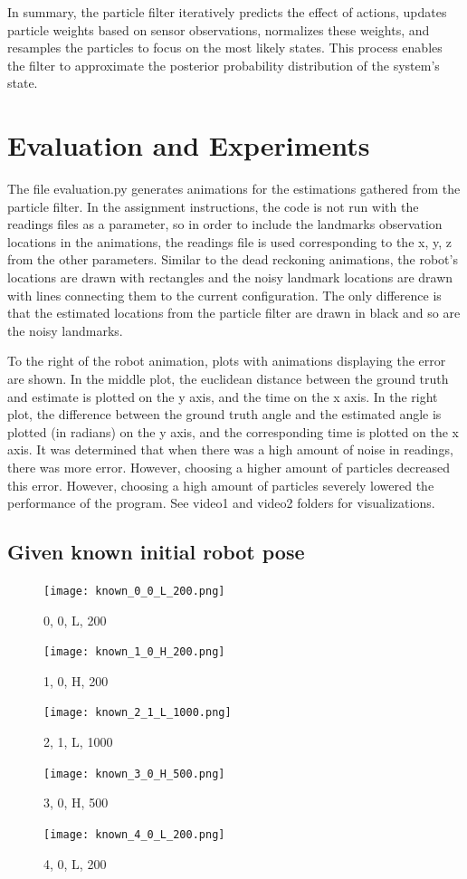 \documentclass{article}
\begin{document}
In summary, the particle filter iteratively predicts the effect of actions, updates particle weights based on sensor observations, normalizes these weights, and resamples the particles to focus on the most likely states. This process enables the filter to approximate the posterior probability distribution of the system's state.

\section{Evaluation and Experiments}
The file evaluation.py generates animations for the estimations gathered from the particle filter. In the assignment instructions, the code is not run with the readings files as a parameter, so in order to include the landmarks observation locations in the animations, the readings file is used corresponding to the x, y, z from the other parameters. Similar to the dead reckoning animations, the robot's locations are drawn with rectangles and the noisy landmark locations are drawn with lines connecting them to the current configuration. The only difference is that the estimated locations from the particle filter are drawn in black and so are the noisy landmarks. 

To the right of the robot animation, plots with animations displaying the error are shown. In the middle plot, the euclidean distance between the ground truth and estimate is plotted on the y axis, and the time on the x axis. In the right plot, the difference between the ground truth angle and the estimated angle is plotted (in radians) on the y axis, and the corresponding time is plotted on the x axis. It was determined that when there was a high amount of noise in readings, there was more error. However, choosing a higher amount of particles decreased this error. However, choosing a high amount of particles severely lowered the performance of the program. See video1 and video2 folders for visualizations.

\subsection{Given known initial robot pose}

\begin{figure}[ht]
    \centering
    \texttt{[image: known\_0\_0\_L\_200.png]}
    \caption{0, 0, L, 200}
\end{figure}
\begin{figure}[ht]
    \centering
    \texttt{[image: known\_1\_0\_H\_200.png]}
    \caption{1, 0, H, 200}
\end{figure}
\begin{figure}[ht]
    \centering
    \texttt{[image: known\_2\_1\_L\_1000.png]}
    \caption{2, 1, L, 1000}
\end{figure}
\begin{figure}[ht]
    \centering
    \texttt{[image: known\_3\_0\_H\_500.png]}
    \caption{3, 0, H, 500}
\end{figure}
\begin{figure}[ht]
    \centering
    \texttt{[image: known\_4\_0\_L\_200.png]}
    \caption{4, 0, L, 200}
\end{figure}
\end{document}

